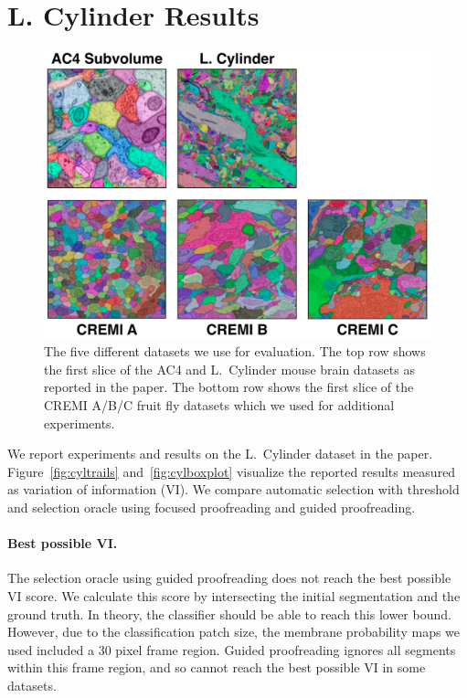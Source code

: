 \section{L. Cylinder Results}

\begin{figure}[t]
\centering
\includegraphics[width=\linewidth]{gfx/datasets.png}
\caption{The five different datasets we use for evaluation. The top row shows the first slice of the AC4 and L.~Cylinder mouse brain datasets as reported in the paper. The bottom row shows the first slice of the CREMI A/B/C fruit fly datasets which we used for additional experiments.}
\label{fig:datasets}
\end{figure}

We report experiments and results on the L.~Cylinder dataset in the paper. Figure~\ref{fig:cyltrails} and~\ref{fig:cylboxplot} visualize the reported results measured as variation of information (VI). We compare automatic selection with threshold and selection oracle using focused proofreading and guided proofreading.

\paragraph{Best possible VI.} The selection oracle using guided proofreading does not reach the best possible VI score. We calculate this score by intersecting the initial segmentation and the ground truth. In theory, the classifier should be able to reach this lower bound. However, due to the classification patch size, the membrane probability maps we used included a 30 pixel frame region. Guided proofreading ignores all segments within this frame region, and so cannot reach the best possible VI in some datasets.

